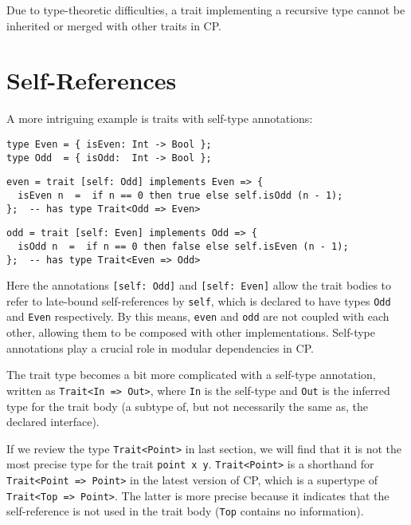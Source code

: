 \begin{tipblock}
Due to type-theoretic difficulties, a trait implementing a recursive type cannot
be inherited or merged with other traits in CP.
\end{tipblock}

\section{Self-References}

A more intriguing example is traits with self-type annotations:
\begin{lstlisting}
type Even = { isEven: Int -> Bool };
type Odd  = { isOdd:  Int -> Bool };
\end{lstlisting}
\vspace{-1ex}
\begin{lstlisting}
even = trait [self: Odd] implements Even => {
  isEven n  =  if n == 0 then true else self.isOdd (n - 1);
};  -- has type Trait<Odd => Even>
\end{lstlisting}
\vspace{-1ex}
\begin{lstlisting}
odd = trait [self: Even] implements Odd => {
  isOdd n  =  if n == 0 then false else self.isEven (n - 1);
};  -- has type Trait<Even => Odd>
\end{lstlisting}
Here the annotations \lstinline{[self: Odd]} and \lstinline{[self: Even]} allow
the trait bodies to refer to late-bound self-references by \lstinline{self},
which is declared to have types \lstinline{Odd} and \lstinline{Even}
respectively. By this means, \lstinline{even} and \lstinline{odd} are not
coupled with each other, allowing them to be composed with other
implementations. Self-type annotations play a crucial role in modular
dependencies in CP.

The trait type becomes a bit more complicated with a self-type annotation,
written as \lstinline{Trait<In => Out>}, where \lstinline{In} is the self-type
and \lstinline{Out} is the inferred type for the trait body (a subtype of, but
not necessarily the same as, the declared interface).

\begin{tipblock}
If we review the type \lstinline{Trait<Point>} in last section, we will find
that it is not the most precise type for the trait \lstinline{point x y}.
\lstinline{Trait<Point>} is a shorthand for \lstinline{Trait<Point => Point>} in
the latest version of CP, which is a supertype of \lstinline{Trait<Top => Point>}.
The latter is more precise because it indicates that the self-reference is not
used in the trait body (\lstinline{Top} contains no information).
\end{tipblock}

